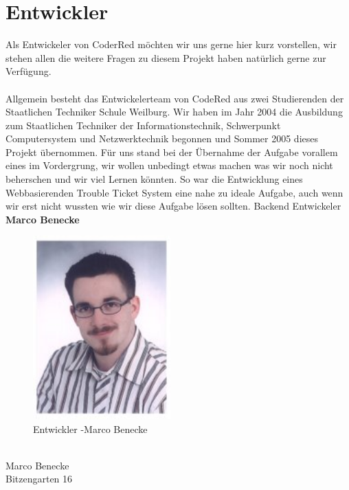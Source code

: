 \chapter{Entwickler}  %
\label{chapter:Entwickler}  %

Als Entwickeler von CoderRed möchten wir uns gerne hier kurz vorstellen, wir stehen allen die weitere Fragen zu diesem Projekt haben natürlich gerne zur Verfügung. \\
\\
Allgemein besteht das Entwickelerteam von CodeRed aus zwei Studierenden der Staatlichen Techniker Schule Weilburg. Wir haben im Jahr 2004 die Ausbildung zum Staatlichen Techniker der Informationstechnik, Schwerpunkt Computersystem und Netzwerktechnik begonnen und Sommer 2005 dieses Projekt übernommen. Für uns stand bei der Übernahme der Aufgabe vorallem eines im Vordergrung, wir wollen unbedingt etwas machen was wir noch nicht beherschen und wir viel Lernen könnten. So war die Entwicklung eines Webbasierenden Trouble Ticket System eine nahe zu ideale Aufgabe, auch wenn wir erst nicht wussten wie wir diese Aufgabe lösen sollten.   
\pagebreak
Backend Entwickeler \\
\textbf{Marco Benecke}
\\
\begin{figure}[h]
\begin{center}
   \includegraphics[width=150pt]{../bilder/marcob.jpg}
   \caption{Entwickler -Marco Benecke}
   \label{Entwickler - Backend und Datenbank}
\end{center}
\end{figure}
\\
Marco Benecke \\
Bitzengarten 16 \\
